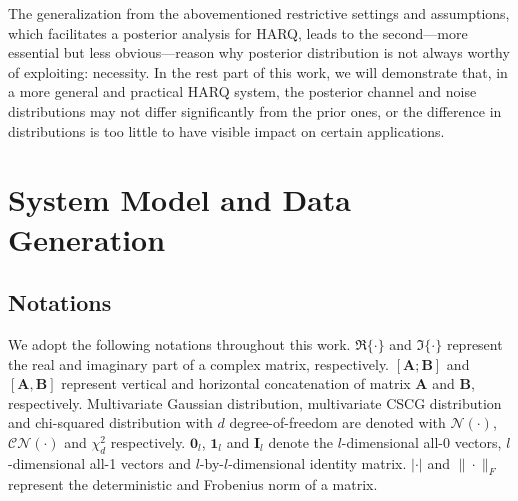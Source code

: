\documentclass[journal,draftcls,onecolumn,12pt,twoside]{IEEEtran}
\begin{document}
The generalization from the abovementioned restrictive settings and assumptions,
which facilitates a posterior analysis for HARQ, leads to the
second---more essential but less obvious---reason why posterior distribution is
not always worthy of exploiting: necessity. In the rest part of this work, we
will demonstrate that, in a more general and practical HARQ system, the
posterior channel and noise distributions may not differ significantly from the
prior ones, or the difference in distributions is too little to have visible
impact on certain applications.

\section{System Model and Data Generation}
\label{sec:model_data}

\subsection{Notations}
\label{subsec:notation}
We adopt the following notations throughout this work. $\Re\{\cdot\}$ and
$\Im\{\cdot\}$ represent the real and imaginary part of a complex matrix,
respectively. $[\mathbf{A};\mathbf{B}]$ and $[\mathbf{A},\mathbf{B}]$ represent
vertical and horizontal concatenation of matrix $\mathbf{A}$ and $\mathbf{B}$,
respectively. Multivariate Gaussian distribution, 
multivariate CSCG distribution and chi-squared distribution with $d$
degree-of-freedom are denoted with $\mathcal{N}(\cdot)$, $\mathcal{CN}(\cdot)$
and $\chi_d^2$ respectively. $\mathbf{0}_l$, $\mathbf{1}_l$ and $\mathbf{I}_l$ denote the
$l$-dimensional all-0 vectors, $l$-dimensional all-1 vectors and
$l$-by-$l$-dimensional identity matrix. $|\cdot|$ and $\|\cdot\|_F$ represent
the deterministic and Frobenius norm of a matrix.
\end{document}
